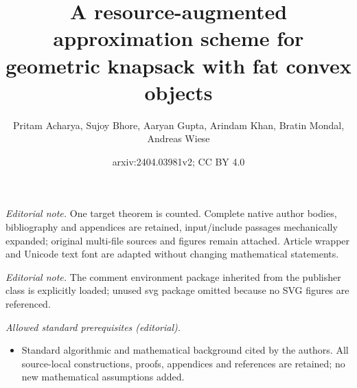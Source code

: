 \documentclass[10pt,a4paper]{article}
\title{A resource-augmented approximation scheme for geometric knapsack with fat convex objects}
\author{Pritam Acharya, Sujoy Bhore, Aaryan Gupta, Arindam Khan, Bratin Mondal, Andreas Wiese}
\date{arxiv:2404.03981v2; CC BY 4.0}
\theoremstyle{plain}
\theoremstyle{plain}
\theoremstyle{plain}
\theoremstyle{definition}
\begin{document}
\maketitle
\noindent\textit{Editorial note.} One target theorem is counted. Complete native author bodies, bibliography and appendices are retained, input/include passages mechanically expanded; original multi-file sources and figures remain attached. Article wrapper and Unicode text font are adapted without changing mathematical statements.\par\medskip
\noindent\textit{Editorial note.} The comment environment package inherited from the publisher class is explicitly loaded; unused svg package omitted because no SVG figures are referenced.\par\medskip
\noindent\textit{Allowed standard prerequisites (editorial).}\begin{itemize}
\item Standard algorithmic and mathematical background cited by the authors. All source-local constructions, proofs, appendices and references are retained; no new mathematical assumptions added.
\end{itemize}\medskip
\end{document}
